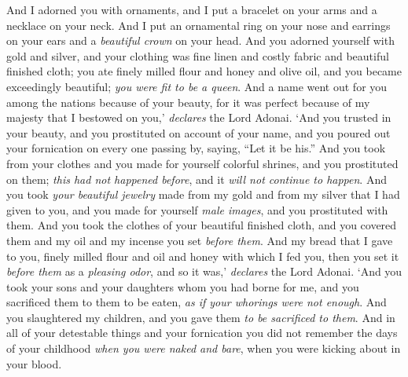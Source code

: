 \begin{biblechapter}
\verse And I adorned you with ornaments, and I put a bracelet on your arms and a necklace on your neck.
\verse And I put an ornamental ring on your nose and earrings on your ears and a \textit{beautiful crown} on your head.
\verse And you adorned yourself with gold and silver, and your clothing was fine linen and costly fabric and beautiful finished cloth; you ate finely milled flour and honey and olive oil, and you became exceedingly beautiful; \textit{you were fit to be a queen}.
\verse And a name went out for you among the nations because of your beauty, for it was perfect because of my majesty that I bestowed on you,’ \textit{declares} the Lord Adonai.
\verse ‘And you trusted in your beauty, and you prostituted on account of your name, and you poured out your fornication on every one passing by, saying, “Let it be his.”
\verse And you took from your clothes and you made for yourself colorful shrines, and you prostituted on them; \textit{this had not happened before}, and it \textit{will not continue to happen}.
\verse And you took \textit{your beautiful jewelry} made from my gold and from my silver that I had given to you, and you made for yourself \textit{male images}, and you prostituted with them.
\verse And you took the clothes of your beautiful finished cloth, and you covered them and my oil and my incense you set \textit{before them}.
\verse And my bread that I gave to you, finely milled flour and oil and honey with which I fed you, then you set it \textit{before them} as a \textit{pleasing odor}, and so it was,’ \textit{declares} the Lord Adonai.
\verse ‘And you took your sons and your daughters whom you had borne for me, and you sacrificed them to them to be eaten, \textit{as if your whorings were not enough}.
\verse And you slaughtered my children, and you gave them \textit{to be sacrificed to them}.
\verse And in all of your detestable things and your fornication you did not remember the days of your childhood \textit{when you were naked and bare}, when you were kicking about in your blood.

\end{biblechapter}
